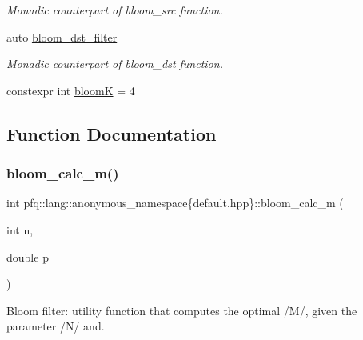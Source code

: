 \begin{DoxyCompactItemize}
\begin{DoxyCompactList}\small\item\em Monadic counterpart of {\ttfamily bloom\+\_\+src} function. \end{DoxyCompactList}\item 
auto \hyperlink{namespacepfq_1_1lang_1_1anonymous__namespace_02default_8hpp_03_a71aa2d21ceb343786b3911801eb0741b}{bloom\+\_\+dst\+\_\+filter}
\begin{DoxyCompactList}\small\item\em Monadic counterpart of {\ttfamily bloom\+\_\+dst} function. \end{DoxyCompactList}\item 
constexpr int \hyperlink{namespacepfq_1_1lang_1_1anonymous__namespace_02default_8hpp_03_a56750cdea1537acfa24c256b64924004}{bloomK} = 4
\end{DoxyCompactItemize}


\subsection{Function Documentation}
\mbox{\label{namespacepfq_1_1lang_1_1anonymous__namespace_02default_8hpp_03_a69262c3acb476a85eb29e16540ae3f08}} 
\subsubsection{\texorpdfstring{bloom\+\_\+calc\+\_\+m()}{bloom\_calc\_m()}}
{\footnotesize\ttfamily int pfq\+::lang\+::anonymous\+\_\+namespace\{default.\+hpp\}\+::bloom\+\_\+calc\+\_\+m (\begin{DoxyParamCaption}\item[{int}]{n,  }\item[{double}]{p }\end{DoxyParamCaption})\hspace{0.3cm}{\ttfamily [inline]}}



Bloom filter\+: utility function that computes the optimal /\+M/, given the parameter /\+N/ and. 

